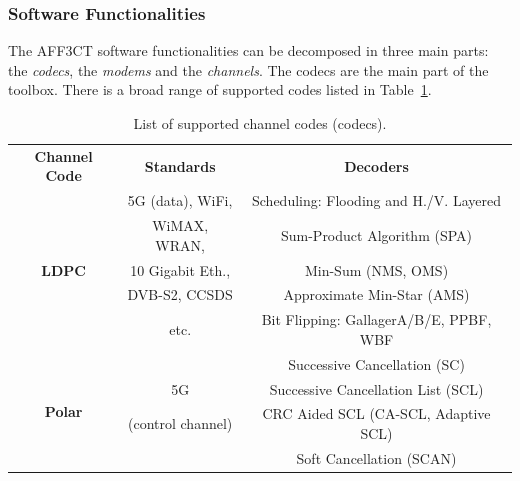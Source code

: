 \documentclass[11pt]{report}
\newcommand{\AFFECT}{AFF3CT\xspace}
\begin{document}
\subsubsection{Software Functionalities}
\label{}

The \AFFECT software functionalities can be decomposed in three main parts: the
\textit{codecs}, the \textit{modems} and the \textit{channels}. The codecs are
the main part of the toolbox. There is a broad range of supported codes listed
in Table~\ref{tab:codecs}.

\begin{table}[htp]
  \centering
  \caption{List of supported channel codes (codecs).}
  \label{tab:codecs}
  {\footnotesize%
    \begin{tabular}{| c | c | c |}
      \hline
      \multirow{2}{*}{\textbf{Channel Code}}   & \multirow{2}{*}{\textbf{Standards}} & \multirow{2}{*}{\textbf{Decoders}}     \\
                                               &                                     &                                        \\
      \hline
      \multirow{5}{*}{\textbf{LDPC}}           & 5G (data), WiFi,                    & Scheduling: Flooding and H./V. Layered \\
                                               & WiMAX, WRAN,                        & Sum-Product Algorithm (SPA)            \\
                                               & 10 Gigabit Eth.,                    & Min-Sum (NMS, OMS)                     \\
                                               & DVB-S2, CCSDS                       & Approximate Min-Star (AMS)             \\
                                               & etc.                                & Bit Flipping: GallagerA/B/E, PPBF, WBF \\
      \hline
      \multirow{4}{*}{\textbf{Polar}}          &                                     & Successive Cancellation (SC)           \\
                                               & 5G                                  & Successive Cancellation List (SCL)     \\
                                               & (control channel)                   & CRC Aided SCL (CA-SCL, Adaptive SCL)   \\
                                               &                                     & Soft Cancellation (SCAN)               \\

\end{tabular}}
\end{table}
\end{document}
